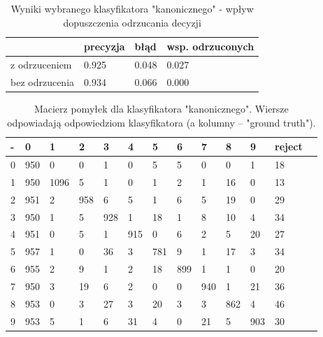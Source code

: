 \documentclass[a4paper]{article}
\begin{document}
\begin{table}[H]
    \caption{Wyniki wybranego klasyfikatora "kanonicznego" - wpływ dopuszczenia odrzucania decyzji
    \label{table:noReject}
    }
\begin{center}
    \begin{tabular}{| l | l | l | l |}
    \hline
        & precyzja & błąd & wsp. odrzuconych \\
    \hline
        z odrzuceniem  & 0.925 & 0.048 & 0.027 \\
        bez odrzucenia & 0.934 & 0.066 &  0.000 \\

    \hline
    \end{tabular}
\end{center}
\end{table}


\begin{table}[H]
    \caption{Macierz pomyłek dla klasyfikatora "kanonicznego".
    Wiersze odpowiadają odpowiedziom klasyfikatora (a kolumny -- "ground truth").
    \label{table:confusion}
    }
\begin{center}
    \begin{tabular}{| l | l | l | l | l | l | l | l | l | l | l | l | l |}
    \hline
        - & 0 & 1 & 2 & 3 & 4 & 5 & 6 & 7 & 8 & 9 & reject\\
    \hline
        0 &  950  &   0   &  0  &   1  &   0  &   5  &   5 &    0  &   0 &    1   & 18 \\
        1 &  950  &1096   &  5  &   1  &   0  &   1  &   2 &    1  &  16 &    0   & 13 \\
        2 &  951  &   2   &958  &   6  &   5  &   1  &   6 &    5  &  19 &    0   & 29 \\
        3 &  950  &   1   &  5  & 928  &   1  &  18  &   1 &    8  &  10 &    4   & 34 \\
        4 &  951  &   0   &  5  &   1  & 915  &   0  &   6 &    2  &   5 &   20   & 27 \\
        5 &  957  &   1   &  0  &  36  &   3  & 781  &   9 &    1  &  17 &    3   & 34 \\
        6 &  955  &   2   &  9  &   1  &   2  &  18  & 899 &    1  &   1 &    0   & 20 \\
        7 &  950  &   3   & 19  &   6  &   2  &   0  &   0 &  940  &   1 &   21   & 36 \\
        8 &  953  &   0   &  3  &  27  &   3  &  20  &   3 &    3  & 862 &    4   & 46 \\
        9 &  953  &   5   &  1  &   6  &  31  &   4  &   0 &   21  &   5 &  903   & 30 \\
    \hline
    \end{tabular}
\end{center}
\end{table}
\end{document}
